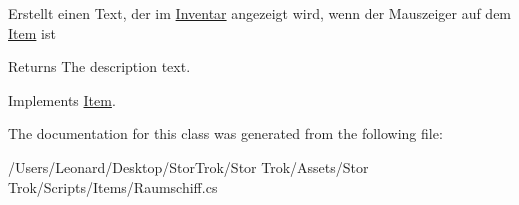 Erstellt einen Text, der im \hyperlink{class_inventar}{Inventar} angezeigt wird, wenn der Mauszeiger auf dem \hyperlink{class_item}{Item} ist 

\begin{DoxyReturn}{Returns}
The description text.
\end{DoxyReturn}


Implements \hyperlink{class_item_ab868f8ccad92378f7352e3a9e0f755ff}{Item}.



The documentation for this class was generated from the following file\+:\begin{DoxyCompactItemize}
\item 
/\+Users/\+Leonard/\+Desktop/\+Stor\+Trok/\+Stor Trok/\+Assets/\+Stor Trok/\+Scripts/\+Items/Raumschiff.\+cs\end{DoxyCompactItemize}
